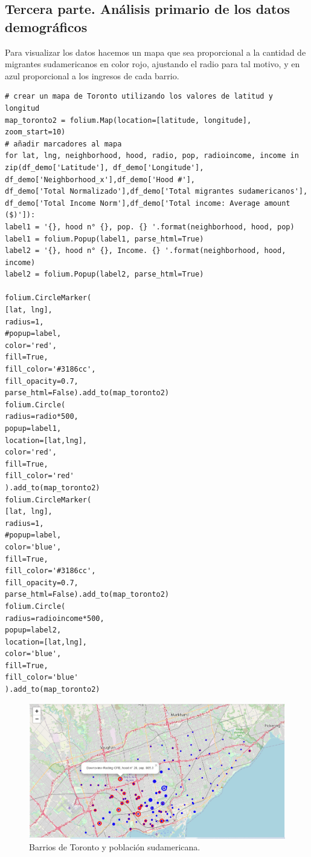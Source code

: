 \documentclass[10pt,a4paper,arial, spanish]{article}
\begin{document}
\subsection{Tercera parte. Análisis primario de los datos demográficos }
Para visualizar los datos hacemos un mapa que sea proporcional a la cantidad de migrantes sudamericanos en color rojo, ajustando el radio para tal motivo, y en azul proporcional a los ingresos de cada barrio.
\begin{verbatim}
# crear un mapa de Toronto utilizando los valores de latitud y longitud
map_toronto2 = folium.Map(location=[latitude, longitude], zoom_start=10)
# añadir marcadores al mapa
for lat, lng, neighborhood, hood, radio, pop, radioincome, income in zip(df_demo['Latitude'], df_demo['Longitude'], 
df_demo['Neighborhood_x'],df_demo['Hood #'],
df_demo['Total Normalizado'],df_demo['Total migrantes sudamericanos'],
df_demo['Total Income Norm'],df_demo['Total income: Average amount ($)']):
label1 = '{}, hood n° {}, pop. {} '.format(neighborhood, hood, pop)
label1 = folium.Popup(label1, parse_html=True)
label2 = '{}, hood n° {}, Income. {} '.format(neighborhood, hood, income)
label2 = folium.Popup(label2, parse_html=True)

folium.CircleMarker(
[lat, lng],
radius=1,
#popup=label,
color='red',
fill=True,
fill_color='#3186cc',
fill_opacity=0.7,
parse_html=False).add_to(map_toronto2)
folium.Circle(
radius=radio*500,
popup=label1,
location=[lat,lng],
color='red',
fill=True,
fill_color='red'
).add_to(map_toronto2) 
folium.CircleMarker(
[lat, lng],
radius=1,
#popup=label,
color='blue',
fill=True,
fill_color='#3186cc',
fill_opacity=0.7,
parse_html=False).add_to(map_toronto2)
folium.Circle(
radius=radioincome*500,
popup=label2,
location=[lat,lng],
color='blue',
fill=True,
fill_color='blue'
).add_to(map_toronto2)     
\end{verbatim}
\begin{figure}[h]
	\centering
	\includegraphics[scale=0.45]{map2}
	\caption[Barrios de Toronto y población sudamericana.]{Barrios de Toronto y población sudamericana.}
	\label{fig:map2}
\end{figure}
\end{document}
